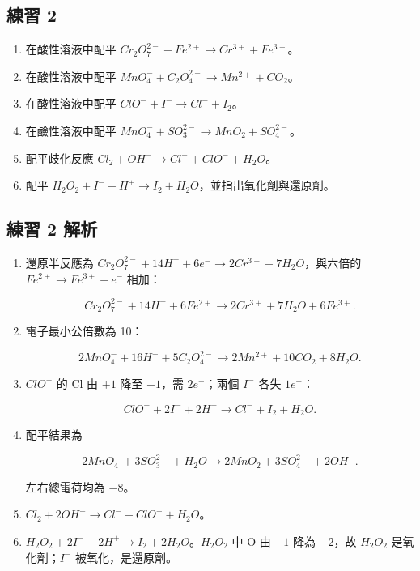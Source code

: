 \documentclass[11pt,a4paper]{article}
\providecommand{\tightlist}{%
  \setlength{\itemsep}{0pt}\setlength{\parskip}{0pt}}
\begin{document}
\subsection{練習 2}\label{ux7df4ux7fd2-2}

\begin{enumerate}
\def\labelenumi{\arabic{enumi}.}
\tightlist
\item
  在酸性溶液中配平 \(Cr_2O_7^{2-}+Fe^{2+}\rightarrow Cr^{3+}+Fe^{3+}\)。
\item
  在酸性溶液中配平 \(MnO_4^-+C_2O_4^{2-}\rightarrow Mn^{2+}+CO_2\)。
\item
  在酸性溶液中配平 \(ClO^-+I^-\rightarrow Cl^-+I_2\)。
\item
  在鹼性溶液中配平 \(MnO_4^-+SO_3^{2-}\rightarrow MnO_2+SO_4^{2-}\)。
\item
  配平歧化反應 \(Cl_2+OH^-\rightarrow Cl^-+ClO^-+H_2O\)。
\item
  配平 \(H_2O_2+I^-+H^+\rightarrow I_2+H_2O\)，並指出氧化劑與還原劑。
\end{enumerate}

\subsection{練習 2 解析}\label{ux7df4ux7fd2-2-ux89e3ux6790}

\begin{enumerate}
\def\labelenumi{\arabic{enumi}.}
\item
  還原半反應為 \(Cr_2O_7^{2-}+14H^++6e^-\rightarrow2Cr^{3+}+7H_2O\)，與六倍的 \(Fe^{2+}\rightarrow Fe^{3+}+e^-\) 相加：

  \[
  Cr_2O_7^{2-}+14H^++6Fe^{2+}\rightarrow2Cr^{3+}+7H_2O+6Fe^{3+}.
  \]
\item
  電子最小公倍數為 10：

  \[
  2MnO_4^-+16H^++5C_2O_4^{2-}\rightarrow2Mn^{2+}+10CO_2+8H_2O.
  \]
\item
  \(ClO^-\) 的 Cl 由 \(+1\) 降至 \(-1\)，需 \(2e^-\)；兩個 \(I^-\) 各失 \(1e^-\)：

  \[
  ClO^-+2I^-+2H^+\rightarrow Cl^-+I_2+H_2O.
  \]
\item
  配平結果為

  \[
  2MnO_4^-+3SO_3^{2-}+H_2O\rightarrow2MnO_2+3SO_4^{2-}+2OH^-.
  \]

  左右總電荷均為 \(-8\)。
\item
  \(Cl_2+2OH^-\rightarrow Cl^-+ClO^-+H_2O\)。
\item
  \(H_2O_2+2I^-+2H^+\rightarrow I_2+2H_2O\)。\(H_2O_2\) 中 O 由 \(-1\) 降為 \(-2\)，故 \(H_2O_2\) 是氧化劑；\(I^-\) 被氧化，是還原劑。
\end{enumerate}
\end{document}
